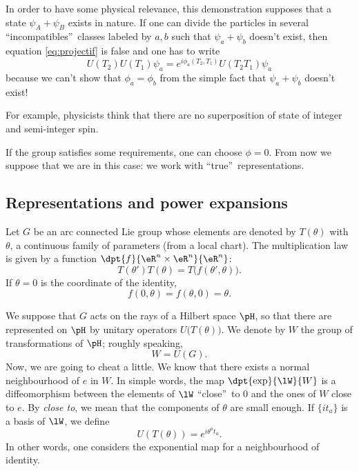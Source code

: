 \begin{remark}
In order to have some physical relevance, this demonstration supposes that a state $\psi_A+\psi_B$ exists in nature. If one can divide the particles in several ``incompatibles''\ classes labeled by $a,b$ such that $\psi_a+\psi_b$ doesn't exist, then equation \eqref{eq:projectif} is false and one has to write 
\[
   U(T_2)U(T_1)\psi_a=e^{i\phi_a(T_2,T_1)}U(T_2T_1)\psi_a
\]
because we can't show that $\phi_a=\phi_b$ from the simple fact that $\psi_a+\psi_b$ doesn't exist!

For example, physicists think that there are no superposition of state of integer and semi-integer spin.
\end{remark}

\begin{remark}
If the group satisfies some requirements, one can choose $\phi=0$. From now we suppose that we are in this case: we work with ``true''\ representations.
\end{remark}


\subsection{Representations and power expansions}

Let $G$ be an arc connected Lie group whose elements are denoted by $T(\theta)$ with $\theta$, a continuous family of parameters (from a local chart). The multiplication law is given by a function $\dpt{f}{\eR^n\times\eR^n}{\eR^n}$:
\begin{equation}\label{eq:T_groupe}
T(\theta')T(\theta)=T\big(f(\theta',\theta)\big).
\end{equation}
If $ \theta=0$ is the coordinate of the identity, 
\begin{equation}\label{eq:f_0}
f(0,\theta)=f(\theta,0)=\theta.
\end{equation}

We suppose that $G$ acts on the rays of a Hilbert space $\pH$, so that there are represented on $\pH$ by unitary operators $U\big(T(\theta)\big)$. We denote by $W$ the group of transformations of $\pH$; roughly speaking, 
\[
     W=U(G).
\]
Now, we are going to cheat a little. We know that there exists a normal neighbourhood of $e$ in $W$. In simple words, the map $\dpt{\exp}{\lW}{W}$ is a diffeomorphism between the elements of $\lW$ ``close''\ to $0$ and the ones of $W$ close to $e$. By \textit{close to}, we mean that the components of $\theta$ are small enough. If $\{it_a\}$ is a basis of $\lW$, we define
\begin{equation}\label{eq:U_expo}
   U(T(\theta))=e^{i\theta^at_a}.
\end{equation}
In other words, one considers the exponential map for a neighbourhood of identity.

